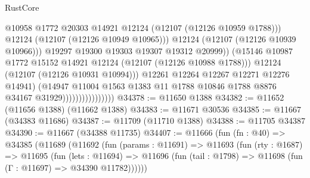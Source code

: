 \begin{lexlean}{RustCore}
\begin{coremodule}
                                                @10958
                                                @1772
                                                @20303
                                                @14921
                                                @12124
                                                (@12107 (@12126 @10959 @1788)))
                                              @12124
                                              (@12107 (@12126 @10949 @10965)))
                                            @12124
                                            (@12107 (@12126 @10939 @10966)))
                                          @19297
                                          @19300
                                          @19303
                                          @19307
                                          @19312
                                          @20999))
                                      (@15146
                                        @10987
                                        @1772
                                        @15152
                                        @14921
                                        @12124
                                        (@12107 (@12126 @10988 @1788)))
                                      @12124
                                      (@12107 (@12126 @10931 @10994)))
                                    @12261
                                    @12264
                                    @12267
                                    @12271
                                    @12276
                                    @14941)
                                  (@14947
                                    @11004
                                    @1563
                                    @1383
                                    @11
                                    @1788
                                    @10846
                                    @1788
                                    @8876
                                    @34167
                                    @31929))))))))))))))))
@34378 := @11650 @1388
@34382 := @11652 (@11656 @1388) (@11662 @1388)
@34383 := @11671 @30536
@34385 := @11667 (@34383 @11686)
@34387 := @11709 (@11710 @1388)
@34388 := @11705 @34387
@34390 := @11667 (@34388 @11735)
@34407 := @11666
    (fun (fn : @40) =>
    @34385
      (@11689
        (@11692
          (fun (params : @11691) =>
          @11693
            (fun (rty : @1687) =>
            @11695
              (fun (lets : @11694) =>
              @11696 (fun (tail : @1798) => @11698 (fun (Γ : @11697) => @34390 @11782))))))

\end{coremodule}
\end{lexlean}
